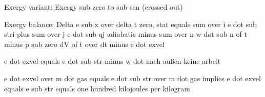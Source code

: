 Exergy variant:
Exergy sub zero to sub sen (crossed out)

Exergy balance:
Delta e sub x over delta t zero, stat equals sum over i e dot sub stri plus sum over j e dot sub qj adiabatic minus sum over n w dot sub n of t minus p sub zero dV of t over dt minus e dot exvel

e dot exvel equals e dot sub str minus w dot nach außen keine arbeit

e dot exvel over m dot gas equals e dot sub str over m dot gas implies e dot exvel equals e sub str equals one hundred kilojoules per kilogram